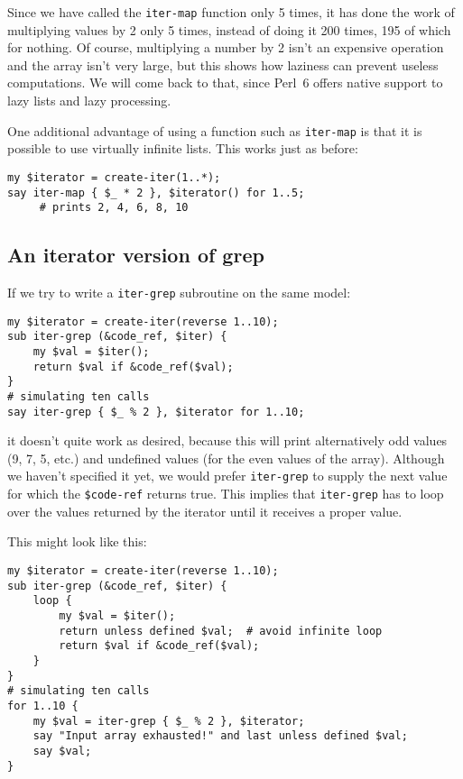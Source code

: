 Since we have called the {\tt iter-map} function only 5 times, 
it has done the work of multiplying values by 2 only 5 times, 
instead of doing it 200 times, 195 of which for nothing. 
Of course, multiplying a number by 2 isn't an expensive 
operation and the array isn't very large, but this shows 
how laziness can prevent useless computations. We will come 
back to that, since Perl~6 offers native support to lazy 
lists and lazy processing.

One additional advantage of using a function such as 
{\tt iter-map} is that it is possible to use 
virtually infinite lists. This works just as before:

\begin{verbatim}
my $iterator = create-iter(1..*);
say iter-map { $_ * 2 }, $iterator() for 1..5;
     # prints 2, 4, 6, 8, 10
\end{verbatim}

\subsection{An iterator version of grep}

If we try to write a {\tt iter-grep} subroutine on the same 
model:

\begin{verbatim}
my $iterator = create-iter(reverse 1..10);
sub iter-grep (&code_ref, $iter) {
	my $val = $iter();
	return $val if &code_ref($val);
}
# simulating ten calls
say iter-grep { $_ % 2 }, $iterator for 1..10;
\end{verbatim}

it doesn't quite work as desired, because this will print 
alternatively odd values (9, 7, 5, etc.) and undefined 
values (for the even values of the array). Although we 
haven't specified it yet, we would prefer {\tt iter-grep} 
to supply the next value for which the \verb'$code-ref' 
returns true. This implies that {\tt iter-grep} has to 
loop over the values returned by the iterator until it 
receives a proper value.

This might look like this:

\begin{verbatim}
my $iterator = create-iter(reverse 1..10);
sub iter-grep (&code_ref, $iter) {
	loop {
		my $val = $iter();
		return unless defined $val;  # avoid infinite loop
	    return $val if &code_ref($val);
	}
}
# simulating ten calls
for 1..10 {
	my $val = iter-grep { $_ % 2 }, $iterator;
	say "Input array exhausted!" and last unless defined $val;
	say $val;
}
\end{verbatim}

